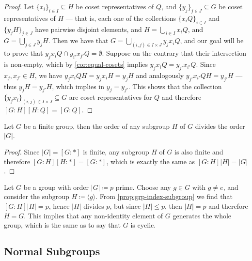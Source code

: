 \begin{proof}
Let \(\{x_{i}\}_{i \in I} \subseteq H\) be coset representatives of \(Q\), and
\(\{y_{j}\}_{j \in J} \subseteq G\) be coset representatives of \(H\) --- that
is, each one of the collections \(\{x_i Q\}_{i \in I}\) and \(\{y_{j} H\}_{j \in
J}\) have pairwise disjoint elements, and \(H = \bigcup_{i \in I} x_i Q\), and
\(G = \bigcup_{j \in J} y_j H\). Then we have that \(G = \bigcup_{(i, j) \in I
\times J} y_j x_i Q\), and our goal will be to prove that \(y_j x_i Q \cap
y_{i'} x_{j'} Q = \emptyset\). Suppose on the contrary that their intersection
is non-empty, which by \cref{cor:equal-cosets} implies \(y_j x_i Q = y_{j'}
x_{i'} Q\). Since \(x_j, x_{j'} \in H\), we have \(y_j x_i Q H = y_j x_i H = y_j
H\) and analogously \(y_{j'} x_{i'} Q H = y_{j'} H\) --- thus \(y_j H = y_{j'}
H\), which implies in \(y_j = y_{j'}\). This shows that the collection \(\{y_{j}
x_i\}_{(i, j) \in I \times J} \subseteq G\) are coset representatives for \(Q\)
and therefore \([G : H] [H : Q] = [G : Q]\).
\end{proof}

\begin{corollary}
\label{cor:order-subgroup-divides-order-group}
Let \(G\) be a finite group, then the order of any subgroup \(H\) of \(G\)
divides the order \(|G|\).
\end{corollary}

\begin{proof}
Since \(|G| = [G : *]\) is finite, any subgroup \(H\) of \(G\) is also finite
and therefore \([G : H] [H : *] = [G : *]\), which is exactly the same as \([G :
H] |H| = |G|\).
\end{proof}

\begin{example}
\label{exp:grp-prime-order-cyclic}
Let \(G\) be a group with order \(|G| \coloneq p\) prime. Choose any \(g \in G\)
with \(g \neq e\), and consider the subgroup \(H \coloneq \langle g
\rangle\). From \cref{prop:grp-index-subgroup} we find that \([G : H] |H| = p\),
hence \(|H|\) divides \(p\), but since \(|H| \leq p\), then \(|H| = p\) and
therefore \(H = G\). This implies that any non-identity element of \(G\)
generates the whole group, which is the same as to say that \(G\) is cyclic.
\end{example}

\subsection{Normal Subgroups}

